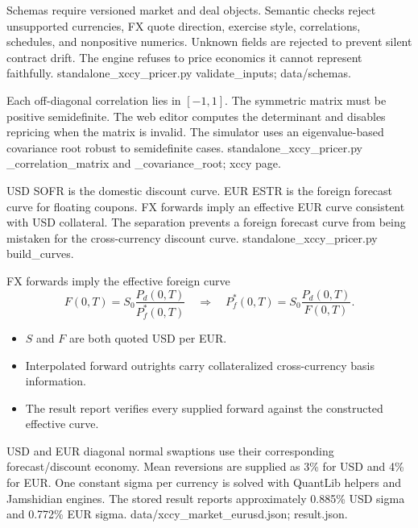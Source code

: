 
{Schemas require versioned market and deal objects.}
{Semantic checks reject unsupported currencies, FX quote direction, exercise style, correlations, schedules, and nonpositive numerics.}
{Unknown fields are rejected to prevent silent contract drift.}
{The engine refuses to price economics it cannot represent faithfully.}
{standalone\_xccy\_pricer.py validate\_inputs; data/schemas.}

{Each off-diagonal correlation lies in $[-1,1]$.}
{The symmetric matrix must be positive semidefinite.}
{The web editor computes the determinant and disables repricing when the matrix is invalid.}
{The simulator uses an eigenvalue-based covariance root robust to semidefinite cases.}
{standalone\_xccy\_pricer.py \_correlation\_matrix and \_covariance\_root; xccy page.}

{USD SOFR is the domestic discount curve.}
{EUR ESTR is the foreign forecast curve for floating coupons.}
{FX forwards imply an effective EUR curve consistent with USD collateral.}
{The separation prevents a foreign forecast curve from being mistaken for the cross-currency discount curve.}
{standalone\_xccy\_pricer.py build\_curves.}

\begin{frame}{FX forwards imply the effective foreign curve}
  \[
    F(0,T)=S_0\frac{P_d(0,T)}{P_f^*(0,T)}
    \quad\Longrightarrow\quad
    P_f^*(0,T)=S_0\frac{P_d(0,T)}{F(0,T)}.
  \]
  \begin{itemize}\setlength\itemsep{0.8em}
    \item $S$ and $F$ are both quoted USD per EUR.
    \item Interpolated forward outrights carry collateralized cross-currency basis information.
    \item The result report verifies every supplied forward against the constructed effective curve.
  \end{itemize}
\end{frame}

{USD and EUR diagonal normal swaptions use their corresponding forecast/discount economy.}
{Mean reversions are supplied as 3\% for USD and 4\% for EUR.}
{One constant sigma per currency is solved with QuantLib helpers and Jamshidian engines.}
{The stored result reports approximately 0.885\% USD sigma and 0.772\% EUR sigma.}
{data/xccy\_market\_eurusd.json; result.json.}

